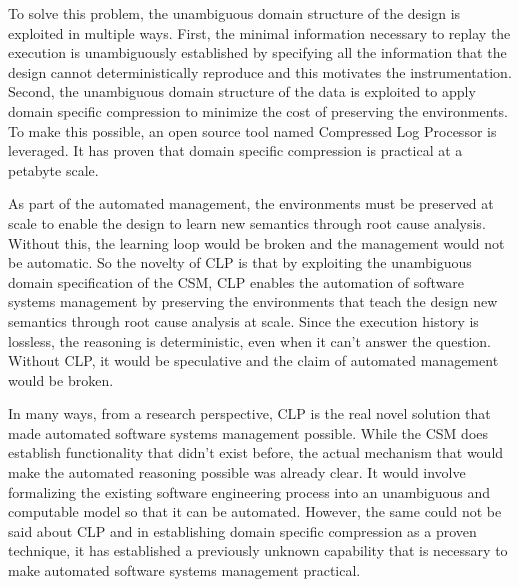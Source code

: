 To solve this problem, the unambiguous domain structure of the design is exploited in multiple ways. First, the minimal information necessary to replay the execution is unambiguously established by specifying all the information that the design cannot deterministically reproduce and this motivates the instrumentation. Second, the unambiguous domain structure of the data is exploited to apply domain specific compression to minimize the cost of preserving the environments. To make this possible, an open source tool named Compressed Log Processor is leveraged. It has proven that domain specific compression is practical at a petabyte scale.

As part of the automated management, the environments must be preserved at scale to enable the design to learn new semantics through root cause analysis. Without this, the learning loop would be broken and the management would not be automatic. So the novelty of CLP is that by exploiting the unambiguous domain specification of the CSM, CLP enables the automation of software systems management by preserving the environments that teach the design new semantics through root cause analysis at scale. Since the execution history is lossless, the reasoning is deterministic, even when it can't answer the question. Without CLP, it would be speculative and the claim of automated management would be broken.

In many ways, from a research perspective, CLP is the real novel solution that made automated software systems management possible. While the CSM does establish functionality that didn't exist before, the actual mechanism that would make the automated reasoning possible was already clear. It would involve formalizing the existing software engineering process into an unambiguous and computable model so that it can be automated. However, the same could not be said about CLP and in establishing domain specific compression as a proven technique, it has established a previously unknown capability that is necessary to make automated software systems management practical. 